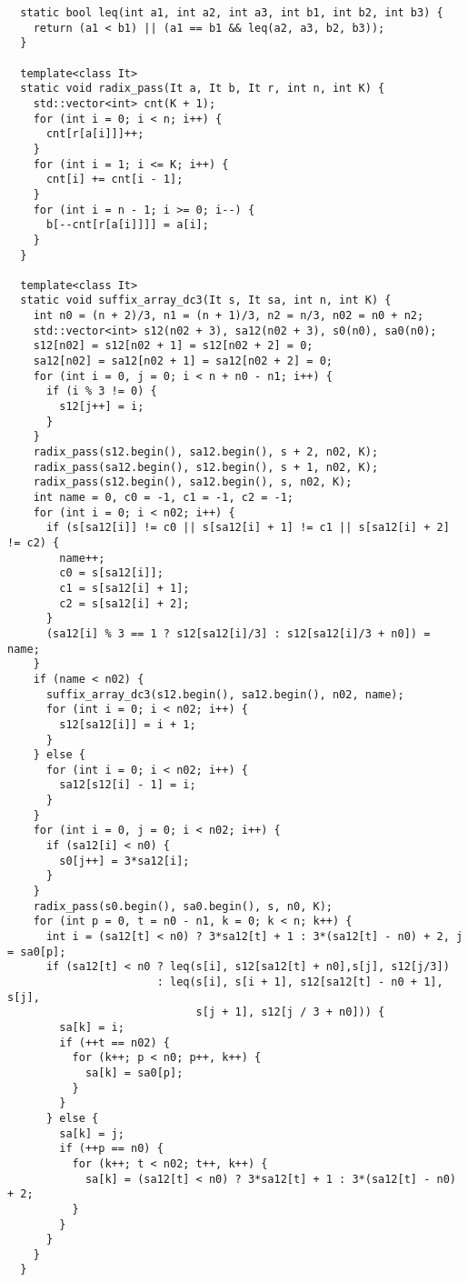 \begin{lstlisting}
  static bool leq(int a1, int a2, int a3, int b1, int b2, int b3) {
    return (a1 < b1) || (a1 == b1 && leq(a2, a3, b2, b3));
  }

  template<class It>
  static void radix_pass(It a, It b, It r, int n, int K) {
    std::vector<int> cnt(K + 1);
    for (int i = 0; i < n; i++) {
      cnt[r[a[i]]]++;
    }
    for (int i = 1; i <= K; i++) {
      cnt[i] += cnt[i - 1];
    }
    for (int i = n - 1; i >= 0; i--) {
      b[--cnt[r[a[i]]]] = a[i];
    }
  }

  template<class It>
  static void suffix_array_dc3(It s, It sa, int n, int K) {
    int n0 = (n + 2)/3, n1 = (n + 1)/3, n2 = n/3, n02 = n0 + n2;
    std::vector<int> s12(n02 + 3), sa12(n02 + 3), s0(n0), sa0(n0);
    s12[n02] = s12[n02 + 1] = s12[n02 + 2] = 0;
    sa12[n02] = sa12[n02 + 1] = sa12[n02 + 2] = 0;
    for (int i = 0, j = 0; i < n + n0 - n1; i++) {
      if (i % 3 != 0) {
        s12[j++] = i;
      }
    }
    radix_pass(s12.begin(), sa12.begin(), s + 2, n02, K);
    radix_pass(sa12.begin(), s12.begin(), s + 1, n02, K);
    radix_pass(s12.begin(), sa12.begin(), s, n02, K);
    int name = 0, c0 = -1, c1 = -1, c2 = -1;
    for (int i = 0; i < n02; i++) {
      if (s[sa12[i]] != c0 || s[sa12[i] + 1] != c1 || s[sa12[i] + 2] != c2) {
        name++;
        c0 = s[sa12[i]];
        c1 = s[sa12[i] + 1];
        c2 = s[sa12[i] + 2];
      }
      (sa12[i] % 3 == 1 ? s12[sa12[i]/3] : s12[sa12[i]/3 + n0]) = name;
    }
    if (name < n02) {
      suffix_array_dc3(s12.begin(), sa12.begin(), n02, name);
      for (int i = 0; i < n02; i++) {
        s12[sa12[i]] = i + 1;
      }
    } else {
      for (int i = 0; i < n02; i++) {
        sa12[s12[i] - 1] = i;
      }
    }
    for (int i = 0, j = 0; i < n02; i++) {
      if (sa12[i] < n0) {
        s0[j++] = 3*sa12[i];
      }
    }
    radix_pass(s0.begin(), sa0.begin(), s, n0, K);
    for (int p = 0, t = n0 - n1, k = 0; k < n; k++) {
      int i = (sa12[t] < n0) ? 3*sa12[t] + 1 : 3*(sa12[t] - n0) + 2, j = sa0[p];
      if (sa12[t] < n0 ? leq(s[i], s12[sa12[t] + n0],s[j], s12[j/3])
                       : leq(s[i], s[i + 1], s12[sa12[t] - n0 + 1], s[j],
                             s[j + 1], s12[j / 3 + n0])) {
        sa[k] = i;
        if (++t == n02) {
          for (k++; p < n0; p++, k++) {
            sa[k] = sa0[p];
          }
        }
      } else {
        sa[k] = j;
        if (++p == n0) {
          for (k++; t < n02; t++, k++) {
            sa[k] = (sa12[t] < n0) ? 3*sa12[t] + 1 : 3*(sa12[t] - n0) + 2;
          }
        }
      }
    }
  }


\end{lstlisting}
